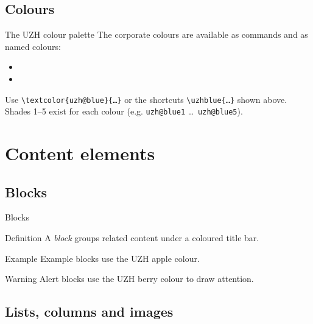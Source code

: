 \documentclass[aspectratio=169,onlytextwidth]{beamer}
\begin{document}
\subsection{Colours}

\begin{frame}{The UZH colour palette}
  The corporate colours are available as commands and as named colours:

  \begin{itemize}
    \item {} \quad {} \quad {}
    \item {} \quad {} \quad {}
  \end{itemize}

  Use \texttt{\textbackslash textcolor\{uzh@blue\}\{\ldots\}} or the shortcuts
  \texttt{\textbackslash uzhblue\{\ldots\}} shown above. Shades 1--5 exist for
  each colour (e.g. \texttt{uzh@blue1} \ldots\ \texttt{uzh@blue5}).
\end{frame}


\section{Content elements}

\subsection{Blocks}

\begin{frame}{Blocks}
  \begin{block}{Definition}
    A \emph{block} groups related content under a coloured title bar.
  \end{block}

  \begin{exampleblock}{Example}
    Example blocks use the UZH apple colour.
  \end{exampleblock}

  \begin{alertblock}{Warning}
    Alert blocks use the UZH berry colour to draw attention.
  \end{alertblock}
\end{frame}

\subsection{Lists, columns and images}
\end{document}
